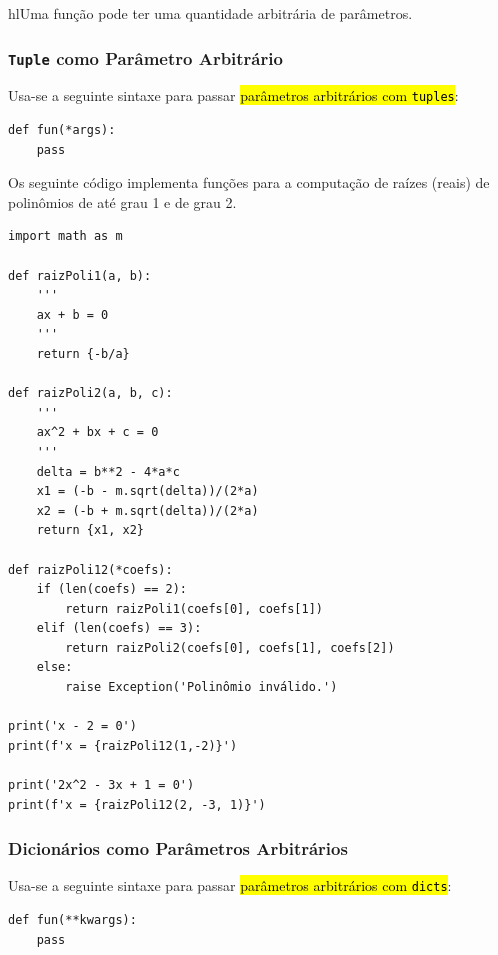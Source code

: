 hl{Uma função pode ter uma quantidade arbitrária de parâmetros}.

\subsubsection{\lstinline+Tuple+ como Parâmetro Arbitrário}

Usa-se a seguinte sintaxe para passar \hl{parâmetros arbitrários com \texttt{tuples}}:

\begin{lstlisting}
def fun(*args):
    pass
\end{lstlisting}

\begin{ex}
  Os seguinte código implementa funções para a computação de raízes (reais) de polinômios de até grau 1 e de grau 2.

\begin{lstlisting}
import math as m

def raizPoli1(a, b):
    '''
    ax + b = 0
    '''
    return {-b/a}

def raizPoli2(a, b, c):
    '''
    ax^2 + bx + c = 0
    '''
    delta = b**2 - 4*a*c
    x1 = (-b - m.sqrt(delta))/(2*a)
    x2 = (-b + m.sqrt(delta))/(2*a)
    return {x1, x2}

def raizPoli12(*coefs):
    if (len(coefs) == 2):
        return raizPoli1(coefs[0], coefs[1])
    elif (len(coefs) == 3):
        return raizPoli2(coefs[0], coefs[1], coefs[2])
    else:
        raise Exception('Polinômio inválido.')

print('x - 2 = 0')
print(f'x = {raizPoli12(1,-2)}')

print('2x^2 - 3x + 1 = 0')
print(f'x = {raizPoli12(2, -3, 1)}')
\end{lstlisting}

\end{ex}

\subsubsection{Dicionários como Parâmetros Arbitrários}

Usa-se a seguinte sintaxe para passar \hl{parâmetros arbitrários com \texttt{dicts}}:

\begin{lstlisting}
def fun(**kwargs):
    pass
\end{lstlisting}


